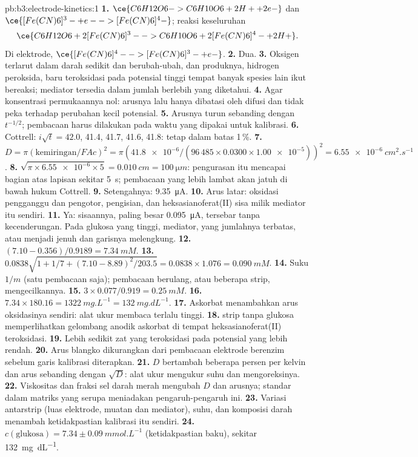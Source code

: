 \begin{solution}{pb:b3:electrode-kinetics:1}
\textbf{1.} $\ce{C6H12O6 -> C6H10O6 + 2 H+ + 2 e-}$ dan $\ce{[Fe(CN)6]^3- + e- -> [Fe(CN)6]^4-}$;
reaksi keseluruhan
\[
  \ce{C6H12O6 + 2 [Fe(CN)6]^3- -> C6H10O6 + 2 [Fe(CN)6]^4- + 2 H+} .
\]
Di elektrode, $\ce{[Fe(CN)6]^4- -> [Fe(CN)6]^3- + e-}$.
\textbf{2.} Dua.
\textbf{3.} Oksigen terlarut dalam darah sedikit dan berubah-ubah, dan
produknya, hidrogen peroksida, baru teroksidasi pada potensial tinggi tempat
banyak spesies lain ikut bereaksi; mediator tersedia dalam jumlah berlebih
yang diketahui.
\textbf{4.} Agar konsentrasi permukaannya nol: arusnya lalu hanya dibatasi
oleh difusi dan tidak peka terhadap perubahan kecil potensial.
\textbf{5.} Arusnya turun sebanding dengan $t^{-1/2}$; pembacaan harus dilakukan
pada waktu yang dipakai untuk kalibrasi.
\textbf{6.} Cottrell: $i\sqrt t = 42.0$, 41.4, 41.7, 41.6, 41.8: tetap dalam
batas 1\,\%.
\textbf{7.} $D = \pi(\text{kemiringan}/FAc)^2 = \pi(\num{41.8e-6}/(96\,485 \times 0.0300 \times \num{1.00e-5}))^2 = \qty{6.55e-6}{cm^2.s^{-1}}$.
\textbf{8.} $\sqrt{\pi \times \num{6.55e-6} \times 5} = \qty{0.010}{cm} = \qty{100}{\micro m}$:
pengurasan itu mencapai bagian atas lapisan sekitar \qty{5}{s}; pembacaan
yang lebih lambat akan jatuh di bawah hukum Cottrell.
\textbf{9.} Setengahnya: \qty{9.35}{\micro A}.
\textbf{10.} Arus latar: oksidasi pengganggu dan pengotor, pengisian, dan
heksasianoferat(II) sisa milik mediator itu sendiri.
\textbf{11.} Ya: sisaannya, paling besar \qty{0.095}{\micro A}, tersebar tanpa
kecenderungan. Pada glukosa yang tinggi, mediator, yang jumlahnya terbatas,
atau  menjadi jenuh dan garisnya melengkung.
\textbf{12.} $(7.10 - 0.356)/0.9189 = \qty{7.34}{mM}$.
\textbf{13.} $0.0838\sqrt{1 + 1/7 + (7.10 - 8.89)^2/203.5} = 0.0838 \times 1.076 = \qty{0.090}{mM}$.
\textbf{14.} Suku $1/m$ (satu pembacaan saja); pembacaan berulang, atau
beberapa strip, mengecilkannya.
\textbf{15.} $3 \times 0.077/0.919 = \qty{0.25}{mM}$.
\textbf{16.} $7.34 \times 180.16 = \qty{1322}{mg.L^{-1}} = \qty{132}{mg.dL^{-1}}$.
\textbf{17.} Askorbat menambahkan arus oksidasinya sendiri: alat ukur membaca
terlalu tinggi.
\textbf{18.}  strip tanpa glukosa memperlihatkan gelombang anodik
askorbat di tempat heksasianoferat(II) teroksidasi.
\textbf{19.} Lebih sedikit zat yang teroksidasi pada potensial yang lebih
rendah.
\textbf{20.} Arus blangko dikurangkan dari pembacaan elektrode berenzim
sebelum garis kalibrasi diterapkan.
\textbf{21.} $D$ bertambah beberapa persen per kelvin dan arus sebanding dengan
$\sqrt D$: alat ukur mengukur suhu dan mengoreksinya.
\textbf{22.} Viskositas dan fraksi sel darah merah mengubah $D$ dan arusnya;
standar dalam matriks yang serupa meniadakan pengaruh-pengaruh ini.
\textbf{23.} Variasi antarstrip (luas elektrode, muatan  dan mediator),
suhu, dan komposisi darah menambah ketidakpastian kalibrasi itu sendiri.
\textbf{24.} \textbf{$c(\text{glukosa}) = 7.34 \pm \qty{0.09}{mmol.L^{-1}}$}
(ketidakpastian baku), sekitar \qty{132}{mg.dL^{-1}}.
\end{solution}
